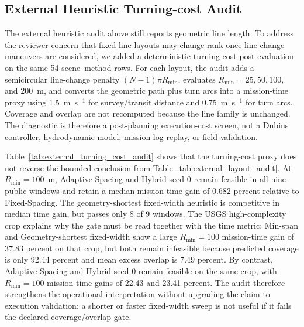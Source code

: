 \documentclass[jmse,article,submit,moreauthors]{Definitions/mdpi}
\begin{document}
\subsection{External Heuristic Turning-cost Audit}
The external heuristic audit above still reports geometric line length. To address the reviewer concern that fixed-line layouts may change rank once line-change maneuvers are considered, we added a deterministic turning-cost post-evaluation on the same 54 scene--method rows. For each layout, the audit adds a semicircular line-change penalty \((N-1)\pi R_{\min}\), evaluates \(R_{\min}=25,50,100,\) and \(200\)~m, and converts the geometric path plus turn arcs into a mission-time proxy using 1.5~m~s\(^{-1}\) for survey/transit distance and 0.75~m~s\(^{-1}\) for turn arcs. Coverage and overlap are not recomputed because the line family is unchanged. The diagnostic is therefore a post-planning execution-cost screen, not a Dubins controller, hydrodynamic model, mission-log replay, or field validation.

Table~\ref{tab:external_turning_cost_audit} shows that the turning-cost proxy does not reverse the bounded conclusion from Table~\ref{tab:external_layout_audit}. At \(R_{\min}=100\)~m, Adaptive Spacing and Hybrid seed 0 remain feasible in all nine public windows and retain a median mission-time gain of 0.682 percent relative to Fixed-Spacing. The geometry-shortest fixed-width heuristic is competitive in median time gain, but passes only 8 of 9 windows. The USGS high-complexity crop explains why the gate must be read together with the time metric: Min-span and Geometry-shortest fixed-width show a large \(R_{\min}=100\) mission-time gain of 37.83 percent on that crop, but both remain infeasible because predicted coverage is only 92.44 percent and mean excess overlap is 7.49 percent. By contrast, Adaptive Spacing and Hybrid seed 0 remain feasible on the same crop, with \(R_{\min}=100\) mission-time gains of 22.43 and 23.41 percent. The audit therefore strengthens the operational interpretation without upgrading the claim to execution validation: a shorter or faster fixed-width sweep is not useful if it fails the declared coverage/overlap gate.
\end{document}
